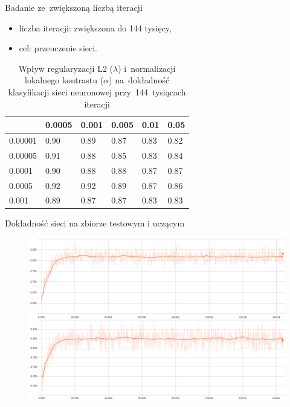 \documentclass[xcolor=dvipsnames]{beamer}
\begin{document}
\begin{frame}{Badanie ze~zwiększoną liczbą iteracji}
    \begin{itemize}
        \item liczba iteracji: zwiększona do 144 tysięcy,
        \item cel: przeuczenie sieci.
    \end{itemize}
    \begin{table}[H]
        \centering
        \begin{tabular}{|l|l|l|l|l|l|}
            \hline
            \backslashbox{$\alpha$}{$\lambda$} & 0.0005 & 0.001 & 0.005 & 0.01 & 0.05 \\
            \hline
            0.00001 & 0.90 & 0.89 & 0.87 & 0.83 & 0.82 \\
            \hline
            0.00005 & 0.91 & 0.88 & 0.85 & 0.83 & 0.84 \\
            \hline
            0.0001  & 0.90 & 0.88 & 0.88 & 0.87 & 0.87 \\
            \hline
            0.0005  & 0.92 & 0.92 & 0.89 & 0.87 & 0.86 \\
            \hline
            0.001   & 0.89 & 0.87 & 0.87 & 0.83 & 0.83 \\
            \hline
        \end{tabular}
        \caption{Wpływ regularyzacji L2 ($\lambda$) i~normalizacji lokalnego kontrastu ($\alpha$) na~dokładność klasyfikacji
        sieci neuronowej przy~144~tysiącach iteracji}
        \label{table:wyniki2}
    \end{table}
\end{frame}
\begin{frame}{Dokładność sieci na zbiorze testowym i uczącym}
  \begin{figure}
    \includegraphics[width=\textwidth]{img/badanie_2.png}
  \end{figure}
\end{frame}
\end{document}

